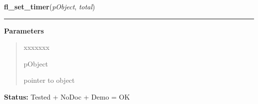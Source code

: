     \label{xformslib:library:fl_set_timer}

    \vspace{0.5ex}

\hspace{.8\funcindent}\begin{boxedminipage}{\funcwidth}

    \raggedright \textbf{fl\_set\_timer}(\textit{pObject}, \textit{total})

    \vspace{-1.5ex}

    \rule{\textwidth}{0.5\fboxrule}
\setlength{\parskip}{2ex}
\setlength{\parskip}{1ex}
      \textbf{Parameters}
      \vspace{-1ex}

      \begin{quote}
        \begin{Ventry}{xxxxxxx}

          \item[pObject]

          pointer to object

        \end{Ventry}

      \end{quote}

\textbf{Status:} Tested + NoDoc + Demo = OK



    \end{boxedminipage}

    \label{xformslib:library:fl_get_timer}

    \vspace{0.5ex}

